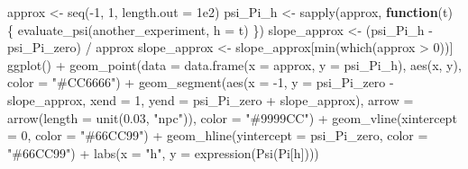 \documentclass[
  11pt,
  openright,twoside]{book}
\newenvironment{Shaded}{\begin{snugshade}}{\end{snugshade}}
\newcommand{\AttributeTok}[1]{\textcolor[rgb]{0.77,0.63,0.00}{#1}}
\newcommand{\ControlFlowTok}[1]{\textcolor[rgb]{0.13,0.29,0.53}{\textbf{#1}}}
\newcommand{\DecValTok}[1]{\textcolor[rgb]{0.00,0.00,0.81}{#1}}
\newcommand{\FloatTok}[1]{\textcolor[rgb]{0.00,0.00,0.81}{#1}}
\newcommand{\FunctionTok}[1]{\textcolor[rgb]{0.00,0.00,0.00}{#1}}
\newcommand{\NormalTok}[1]{#1}
\newcommand{\OtherTok}[1]{\textcolor[rgb]{0.56,0.35,0.01}{#1}}
\newcommand{\SpecialCharTok}[1]{\textcolor[rgb]{0.00,0.00,0.00}{#1}}
\newcommand{\StringTok}[1]{\textcolor[rgb]{0.31,0.60,0.02}{#1}}
\theoremstyle{definition}
\theoremstyle{definition}
\theoremstyle{definition}
\theoremstyle{definition}
\theoremstyle{remark}
\begin{document}
\begin{Shaded}
\begin{Highlighting}[]
\NormalTok{approx }\OtherTok{\textless{}{-}} \FunctionTok{seq}\NormalTok{(}\SpecialCharTok{{-}}\DecValTok{1}\NormalTok{, }\DecValTok{1}\NormalTok{, }\AttributeTok{length.out =} \FloatTok{1e2}\NormalTok{)}
\NormalTok{psi\_Pi\_h }\OtherTok{\textless{}{-}} \FunctionTok{sapply}\NormalTok{(approx, }\ControlFlowTok{function}\NormalTok{(t) \{}
  \FunctionTok{evaluate\_psi}\NormalTok{(another\_experiment, }\AttributeTok{h =}\NormalTok{ t)}
\NormalTok{\})}
\NormalTok{slope\_approx }\OtherTok{\textless{}{-}}\NormalTok{ (psi\_Pi\_h }\SpecialCharTok{{-}}\NormalTok{ psi\_Pi\_zero) }\SpecialCharTok{/}\NormalTok{ approx}
\NormalTok{slope\_approx }\OtherTok{\textless{}{-}}\NormalTok{ slope\_approx[}\FunctionTok{min}\NormalTok{(}\FunctionTok{which}\NormalTok{(approx }\SpecialCharTok{\textgreater{}} \DecValTok{0}\NormalTok{))]}
\FunctionTok{ggplot}\NormalTok{() }\SpecialCharTok{+}
  \FunctionTok{geom\_point}\NormalTok{(}\AttributeTok{data =} \FunctionTok{data.frame}\NormalTok{(}\AttributeTok{x =}\NormalTok{ approx, }\AttributeTok{y =}\NormalTok{ psi\_Pi\_h), }\FunctionTok{aes}\NormalTok{(x, y),}
             \AttributeTok{color =} \StringTok{"\#CC6666"}\NormalTok{) }\SpecialCharTok{+}
  \FunctionTok{geom\_segment}\NormalTok{(}\FunctionTok{aes}\NormalTok{(}\AttributeTok{x =} \SpecialCharTok{{-}}\DecValTok{1}\NormalTok{, }\AttributeTok{y =}\NormalTok{ psi\_Pi\_zero }\SpecialCharTok{{-}}\NormalTok{ slope\_approx,}
                   \AttributeTok{xend =} \DecValTok{1}\NormalTok{, }\AttributeTok{yend =}\NormalTok{ psi\_Pi\_zero }\SpecialCharTok{+}\NormalTok{ slope\_approx),}
               \AttributeTok{arrow =} \FunctionTok{arrow}\NormalTok{(}\AttributeTok{length =} \FunctionTok{unit}\NormalTok{(}\FloatTok{0.03}\NormalTok{, }\StringTok{"npc"}\NormalTok{)),}
               \AttributeTok{color =} \StringTok{"\#9999CC"}\NormalTok{) }\SpecialCharTok{+}
  \FunctionTok{geom\_vline}\NormalTok{(}\AttributeTok{xintercept =} \DecValTok{0}\NormalTok{, }\AttributeTok{color =} \StringTok{"\#66CC99"}\NormalTok{) }\SpecialCharTok{+}
  \FunctionTok{geom\_hline}\NormalTok{(}\AttributeTok{yintercept =}\NormalTok{ psi\_Pi\_zero, }\AttributeTok{color =} \StringTok{"\#66CC99"}\NormalTok{) }\SpecialCharTok{+}
  \FunctionTok{labs}\NormalTok{(}\AttributeTok{x =} \StringTok{"h"}\NormalTok{, }\AttributeTok{y =} \FunctionTok{expression}\NormalTok{(}\FunctionTok{Psi}\NormalTok{(Pi[h]))) }
\end{Highlighting}
\end{Shaded}
\end{document}
